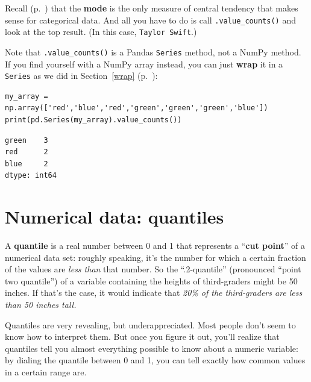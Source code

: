 
Recall (p.~\pageref{mode}) that the \textbf{mode} is the only measure of
central tendency that makes sense for categorical data. And all you have to do
is call \texttt{.value\_counts()} and look at the top result. (In this case,
\texttt{Taylor Swift}.)

Note that \texttt{.value\_counts()} is a Pandas \texttt{Series} method, not a
NumPy method. If you find yourself with a NumPy array instead, you can just
\textbf{wrap} it in a \texttt{Series} as we did in Section~\ref{wrap}
(p.~\pageref{wrap}):

\begin{Verbatim}[fontsize=\small,samepage=true,frame=single,framesep=3mm]
my_array = np.array(['red','blue','red','green','green','green','blue'])
print(pd.Series(my_array).value_counts())
\end{Verbatim}

\begin{Verbatim}[fontsize=\small,samepage=true,frame=leftline,framesep=5mm,framerule=1mm]
green    3
red      2
blue     2
dtype: int64
\end{Verbatim}

\section{Numerical data: quantiles}

\label{quantiles}

A \textbf{quantile} is a real number between 0 and 1 that represents a
``\textbf{cut point}'' of a numerical data set: roughly speaking, it's the
number for which a certain fraction of the values are \textit{less than} that
number. So the ``.2-quantile'' (pronounced ``point two quantile'') of a
variable containing the heights of third-graders might be 50 inches. If that's
the case, it would indicate that \textit{20\% of the third-graders are less
than 50 inches tall.}

Quantiles are very revealing, but underappreciated. Most people don't seem to
know how to interpret them. But once you figure it out, you'll realize that
quantiles tell you almost everything possible to know about a numeric variable:
by dialing the quantile between 0 and 1, you can tell exactly how common values
in a certain range are.


